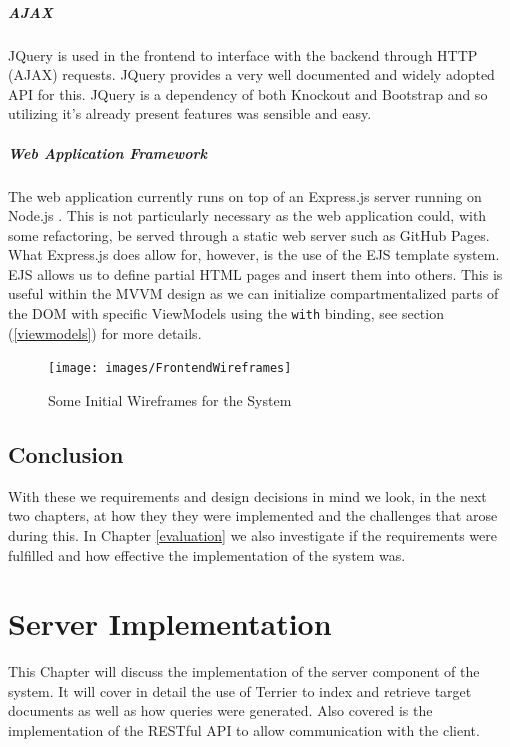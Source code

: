 \documentclass{l4proj}
\newcommand{\code}[1]{\texttt{#1}}
\begin{document}
\paragraph{AJAX}
JQuery is used in the frontend to interface with the backend through HTTP (AJAX) requests. JQuery provides a very well documented and widely adopted API for this. JQuery is a dependency of both Knockout and Bootstrap and so utilizing it's already present features was sensible and easy.

\paragraph{Web Application Framework}
The web application currently runs on top of an Express.js server running on Node.js \cite{express} \cite{node}. This is not particularly necessary as the web application could, with some refactoring, be served through a static web server such as GitHub Pages. What Express.js does allow for, however, is the use of the EJS template system. EJS allows us to define partial HTML pages and insert them into others. This is useful within the MVVM design as we can initialize compartmentalized parts of the DOM with specific ViewModels using the \code{with} binding, see section (\ref{viewmodels}) for more details.

\begin{figure}[H]
\centering
\texttt{[image: images/FrontendWireframes]}
\caption{Some Initial Wireframes for the System}
\label{wireframes}
\end{figure}

\section{Conclusion}
With these we requirements and design decisions in mind we look, in the next two chapters, at how they they were implemented and the challenges that arose during this. In Chapter \ref{evaluation} we also investigate if the requirements were fulfilled and how effective the implementation of the system was.

\chapter{Server Implementation} \label{serverimplementation}
This Chapter will discuss the implementation of the server component of the system. It will cover in detail the use of Terrier to index and retrieve target documents as well as how queries were generated. Also covered is the implementation of the RESTful API to allow communication with the client.
\end{document}
